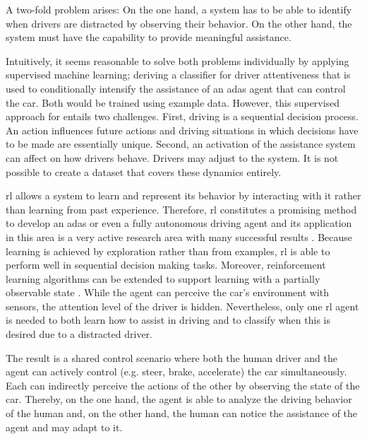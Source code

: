 A two-fold problem arises: On the one hand, a system has to be able to identify when drivers are distracted by observing their behavior. On the other hand, the system must have the capability to provide meaningful assistance. 

Intuitively, it seems reasonable to solve both problems individually by applying supervised machine learning; deriving a classifier for driver attentiveness that is used to conditionally intensify the assistance of an \gls{adas} agent that can control the car. Both would be trained using example data. However, this supervised approach for entails two challenges. First, driving is a sequential decision process. An action influences future actions and driving situations in which decisions have to be made are essentially unique. Second, an activation of the assistance system can affect on how drivers behave. Drivers may adjust to the system. It is not possible to create a dataset that covers these dynamics entirely.



\Gls{rl} allows a system to learn and represent its behavior by interacting with it rather than learning from past experience. Therefore, \gls{rl} constitutes a promising method to develop an \gls{adas} or even a fully autonomous driving agent and its application in this area is a very active research area with many successful results \parencite{rl_driving_survey}. Because learning is achieved by exploration rather than from examples, \gls{rl} is able to perform well in sequential decision making tasks. Moreover, reinforcement learning algorithms can be extended to support learning with a partially observable state \parencite[p.~466]{RL_introductio}. While the agent can perceive the car's environment with sensors, the attention level of the driver is hidden. Nevertheless, only one \gls{rl} agent is needed to both learn how to assist in driving and to classify when this is desired due to a distracted driver.

The result is a shared control scenario where both the human driver and the agent can actively control (e.g. steer, brake, accelerate) the car simultaneously. Each can indirectly perceive the actions of the other by observing the state of the car. Thereby, on the one hand, the agent is able to analyze the driving behavior of the human and, on the other hand, the human can notice the assistance of the agent and may adapt to it. 

